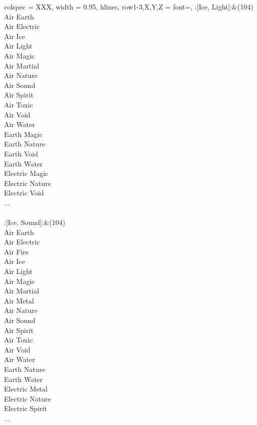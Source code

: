 \begin{longtblr}[
	caption = {2v2 Attacking Effective},
	label = {2v2-Attacking-Effective},
]{
	colspec = {XXX}, width = 0.95\linewidth,
	hlines,
	row{1-3,X,Y,Z} = {font=\bfseries},
}
	:[Ice, Light]:&{(104)\\
	Air Earth \\
	Air Electric \\
	Air Ice \\
	Air Light \\
	Air Magic \\
	Air Martial \\
	Air Nature \\
	Air Sound \\
	Air Spirit \\
	Air Toxic \\
	Air Void \\
	Air Water \\
	Earth Magic \\
	Earth Nature \\
	Earth Void \\
	Earth Water \\
	Electric Magic \\
	Electric Nature \\
	Electric Void \\
	...\\
	}\\

	:[Ice, Sound]:&{(104)\\
	Air Earth \\
	Air Electric \\
	Air Fire \\
	Air Ice \\
	Air Light \\
	Air Magic \\
	Air Martial \\
	Air Metal \\
	Air Nature \\
	Air Sound \\
	Air Spirit \\
	Air Toxic \\
	Air Void \\
	Air Water \\
	Earth Nature \\
	Earth Water \\
	Electric Metal \\
	Electric Nature \\
	Electric Spirit \\
	...\\
	}\\


\end{longtblr}
